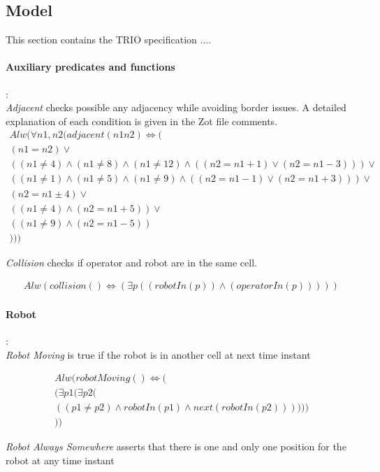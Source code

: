 \subsection{Model}
This section contains the TRIO specification ....

\paragraph{Auxiliary predicates and functions}:\\

\textit{Adjacent} checks possible any adjacency while avoiding border issues. A detailed explanation of each condition is given in the Zot file comments.
\begin{align*}
	Alw(\forall n1,n2 (adjacent(n1 n2)\iff (\\
	(n1 = n2) \lor \\
	((n1 \neq 4)\land(n1 \neq 8)\land(n1 \neq 12)\land((n2=n1+1)\lor(n2=n1-3)))\lor \\
	((n1 \neq 1)\land(n1 \neq 5)\land(n1 \neq 9)\land((n2=n1-1)\lor(n2=n1+3)))\lor \\
	(n2 = n1\pm 4) \lor \\
	((n1 \neq 4)\land(n2 = n1+ 5)) \lor \\
	((n1 \neq 9)\land(n2 = n1- 5))  \\
	)))
\end{align*}

\textit{Collision} checks if operator and robot are in the same cell.

\begin{align*}
	Alw(collision()\iff (\exists p(
	(robotIn(p)) \land 
	(operatorIn(p)) 
	)))
\end{align*}


\paragraph{Robot}:\\

\textit{Robot Moving} is true if the robot is in another cell at next time instant

\begin{align*}
	Alw(robotMoving()\iff (\\
	(\exists p1(\exists p2 (\\
	((p1\neq p2)\land robotIn(p1) \land next(robotIn(p2))) )))\\
	))
\end{align*}

\textit{Robot Always Somewhere} asserts that there is one and only one position for the robot at any time instant


